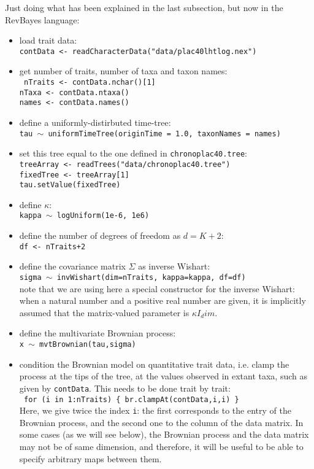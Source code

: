 \documentclass[usletter]{article}
\newcommand{\cmd}[1]{\texttt{#1}}
\begin{document}
Just doing what has been explained in the last subsection, but now in the RevBayes language:
\begin{itemize}
\item
load trait data:
\\
\cmd{contData <- readCharacterData("data/plac40lhtlog.nex")}
\item
get number of traits, number of taxa and taxon names:
\\
\cmd{
nTraits <- contData.nchar()[1]
\\
nTaxa <- contData.ntaxa()
\\
names <- contData.names()
}
\item
define a uniformly-distirbuted time-tree:
\\
\cmd{tau $\sim$ uniformTimeTree(originTime = 1.0, taxonNames = names)}
\item
set this tree equal to the one defined in \cmd{chronoplac40.tree}:
\\
\cmd{treeArray <- readTrees("data/chronoplac40.tree")
\\
fixedTree <- treeArray[1]
\\
tau.setValue(fixedTree)}
\item
define $\kappa$:
\\
\cmd{kappa $\sim$ logUniform(1e-6, 1e6)}
\item
define the number of degrees of freedom as $d = K+2$:
\\
\cmd{df <- nTraits+2}
\item
define the covariance matrix $\Sigma$ as inverse Wishart:
\\
\cmd{sigma $\sim$ invWishart(dim=nTraits, kappa=kappa, df=df)}
\\
note that we are using here a special constructor for the inverse Wishart: when a natural number and a positive real number are given, it is implicitly assumed that the matrix-valued parameter is $\kappa I_dim$.
\item
define the multivariate Brownian process:
\\
\cmd{x $\sim$ mvtBrownian(tau,sigma)}
\item
condition the Brownian model on quantitative trait data,
i.e. clamp the process at the tips of the tree, at the values observed in extant taxa,
such as given by \cmd{contData}. This needs to be done trait by trait:
\\
\cmd{
for (i in 1:nTraits)    \{
        br.clampAt(contData,i,i)
\}
}
\\
Here, we give twice the index \cmd{i}: the first corresponds to the entry of the Brownian process, and the second one to the column of the data matrix. In some cases (as we will see below), the Brownian process and the data matrix may not be of same dimension, and therefore, it will be useful to be able to specify arbitrary maps between them.
\end{itemize}
\end{document}
